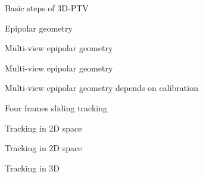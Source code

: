 \begin{frame}[label=ptv-2]{Basic steps of 3D-PTV}
\centering{}
\end{frame}


\begin{frame}[label=ptv-5]{Epipolar geometry}
\centering{}
\end{frame}

\begin{frame}[label=ptv-51]{Multi-view epipolar geometry}
\centering{}
\end{frame}

\begin{frame}[label=ptv-51a]{Multi-view epipolar geometry}
\centering{}
\end{frame}

\begin{frame}[label=ptv-55]{Multi-view epipolar geometry depends on calibration}
\centering{}
\end{frame}

	

\begin{frame}[label=ptv-6]{Four frames sliding tracking}
\centering{}
\end{frame}

\begin{frame}[label=ptv-61]{Tracking in 2D space}
\centering{}
\end{frame}


\begin{frame}[label=ptv-61a]{Tracking in 2D space}
	\centering{}
\end{frame}

\begin{frame}[label=ptv-61b]{Tracking in 3D }
	\centering{}
\end{frame}

